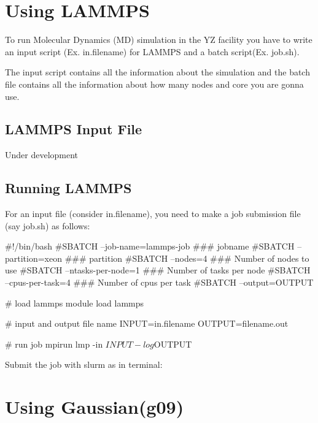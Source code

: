 \documentclass{book}
\begin{document}


\chapter{Using LAMMPS}%
\label{cha:using_lammps}

To run Molecular Dynamics (MD) simulation in the YZ facility you have to write an input script (Ex. in.filename) for LAMMPS and a batch script(Ex. job.sh).

The input script contains all the information about the simulation and the batch file contains all the information about how many nodes and core you are gonna use.

\section{LAMMPS Input File}%
\label{sec:lammps_input_file}

Under development

\section{Running LAMMPS}%
\label{sec:running_lammps}

For an input file (consider in.filename), you need to make a job submission file (say job.sh) as follows:

\begin{myverbatim}
	#!/bin/bash
	#SBATCH --job-name=lammps-job 	### jobname
	#SBATCH --partition=xeon	### partition
	#SBATCH --nodes=4 		### Number of nodes to use
	#SBATCH --ntasks-per-node=1 	### Number of tasks per node
	#SBATCH --cpus-per-task=4 	### Number of cpus per task
	#SBATCH --output=OUTPUT%

	# load lammps
	module load lammps

	# input and output file name
	INPUT=in.filename
	OUTPUT=filename.out

	# run job
	mpirun lmp -in ${INPUT} -log ${OUTPUT}

\end{myverbatim}

Submit the job with slurm as in terminal:



\chapter{Using Gaussian(g09)}%
\label{cha:using_gaussian_g09_}
\end{document}
